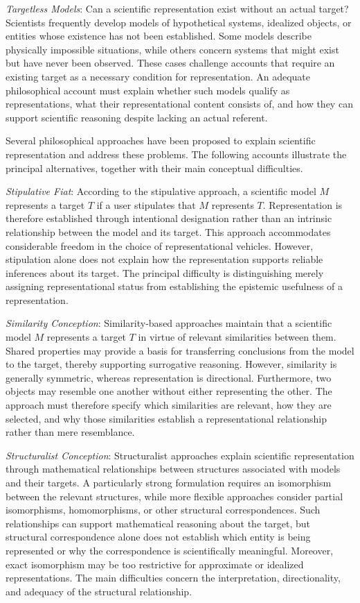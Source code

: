 \emph{Targetless Models}: Can a scientific representation exist without an actual target? Scientists frequently develop models of hypothetical systems, idealized objects, or entities whose existence has not been established. Some models describe physically impossible situations, while others concern systems that might exist but have never been observed. These cases challenge accounts that require an existing target as a necessary condition for representation. An adequate philosophical account must explain whether such models qualify as representations, what their representational content consists of, and how they can support scientific reasoning despite lacking an actual referent.

Several philosophical approaches have been proposed to explain scientific representation and address these problems. The following accounts illustrate the principal alternatives, together with their main conceptual difficulties.

\emph{Stipulative Fiat}: According to the stipulative approach, a scientific model $M$ represents a target $T$ if a user stipulates that $M$ represents $T$. Representation is therefore established through intentional designation rather than an intrinsic relationship between the model and its target. This approach accommodates considerable freedom in the choice of representational vehicles. However, stipulation alone does not explain how the representation supports reliable inferences about its target. The principal difficulty is distinguishing merely assigning representational status from establishing the epistemic usefulness of a representation.

\emph{Similarity Conception}: Similarity-based approaches maintain that a scientific model $M$ represents a target $T$ in virtue of relevant similarities between them. Shared properties may provide a basis for transferring conclusions from the model to the target, thereby supporting surrogative reasoning. However, similarity is generally symmetric, whereas representation is directional. Furthermore, two objects may resemble one another without either representing the other. The approach must therefore specify which similarities are relevant, how they are selected, and why those similarities establish a representational relationship rather than mere resemblance.

\emph{Structuralist Conception}: Structuralist approaches explain scientific representation through mathematical relationships between structures associated with models and their targets. A particularly strong formulation requires an isomorphism between the relevant structures, while more flexible approaches consider partial isomorphisms, homomorphisms, or other structural correspondences. Such relationships can support mathematical reasoning about the target, but structural correspondence alone does not establish which entity is being represented or why the correspondence is scientifically meaningful. Moreover, exact isomorphism may be too restrictive for approximate or idealized representations. The main difficulties concern the interpretation, directionality, and adequacy of the structural relationship.

